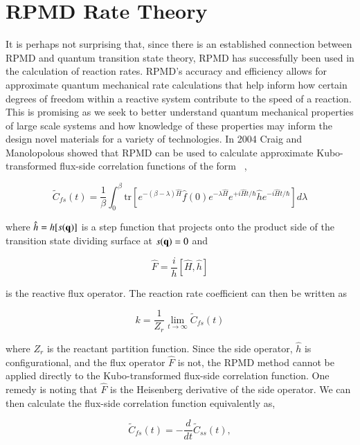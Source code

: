 \documentclass[phd,tocprelim]{cornell}
\begin{document}
\section{RPMD Rate Theory}
It is perhaps not surprising that, since there is an established connection between RPMD and quantum transition state theory, RPMD has successfully been used in the calculation of reaction rates. RPMD's accuracy and efficiency allows for approximate quantum mechanical rate calculations that help inform how certain degrees of freedom within a reactive system contribute to the speed of a reaction. This is promising as we seek to better understand quantum mechanical properties of large scale systems and how knowledge of these properties may inform the design novel materials for a variety of technologies. 
In 2004 Craig and Manolopolous showed that RPMD can be used to calculate approximate Kubo-transformed flux-side correlation functions of the form ~\cite{MANO2005}, 

\begin{equation}
\tilde{C}_{fs}(t)= \frac{1}{\beta} \int_{0}^{\beta} \textrm{tr}[ e^{-(\beta - \lambda)\hat{H}} \hat{f}(0) e^{-\lambda \hat{H}} e^{+i \hat{H}t/\hbar} \hat{h}e^{-i \hat{H}t/\hbar} ]d\lambda
\end{equation}

 where $\hat{h} = h[s( {\bf{q}})]$ is a step function that projects onto the product side of the transition state dividing surface at $s({\bf{q}})=0$ and 
 
 \begin{equation}
 \hat{F} = \frac{i}{h} [ \hat{H}, \hat{h}]
 \end{equation}
 
 is the reactive flux operator.  The reaction rate coefficient can then be written as 
 
 \begin{equation}
 k = \frac{1}{Z_r} \lim_{t\to \infty} \tilde{C}_{fs}(t)
 \end{equation}
 
 where $Z_r$ is the reactant partition function. Since the side operator, $\hat{h}$ is configurational, and the flux operator $\hat{F}$ is not, the RPMD method cannot be applied directly to the Kubo-transformed flux-side correlation function. One remedy is noting that $\hat{F}$ is the Heisenberg derivative of the side operator. We can then calculate the flux-side correlation function equivalently as, 
 
 \begin{equation}
 \tilde{C}_{fs}(t) = -\frac{d}{dt} \tilde{C}_{ss}(t),
 \end{equation}
 
\end{document}
